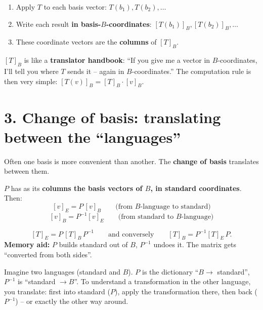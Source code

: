 \documentclass[a4paper,12pt]{article}
\begin{document}
\begin{merkbox}[title={Construction of $[T]_B$}]
\begin{enumerate}[nosep]
    \item Apply $T$ to each basis vector: $T(b_1), T(b_2), \dots$
    \item Write each result \textbf{in basis-$B$-coordinates}: $[T(b_1)]_B, [T(b_2)]_B, \dots$
    \item These coordinate vectors are the \textbf{columns} of $[T]_B$.
\end{enumerate}
\end{merkbox}

\begin{analogie}
$[T]_B$ is like a \textbf{translator handbook}: ``If you give me a vector in $B$-coordinates, I'll tell you where $T$ sends it -- again in $B$-coordinates.'' The computation rule is then very simple: $[T(v)]_B = [T]_B \cdot [v]_B$.
\end{analogie}

\section*{3. Change of basis: translating between the ``languages''}

Often one basis is more convenient than another. The \textbf{change of basis} translates between them.

\begin{merkbox}[title={The change-of-basis matrix $P$}]
$P$ has as its \textbf{columns the basis vectors of $B$, in standard coordinates}. Then:
\[
[v]_E = P \, [v]_B \qquad\text{(from $B$-language to standard)}
\]
\[
[v]_B = P^{-1} [v]_E \qquad\text{(from standard to $B$-language)}
\]
\end{merkbox}

\begin{merkbox}[title={Change of basis for transformations}]
\[
[T]_E = P\,[T]_B\,P^{-1} \qquad\text{and conversely}\qquad [T]_B = P^{-1} [T]_E\, P.
\]
\textbf{Memory aid:} $P$ builds standard out of $B$, $P^{-1}$ undoes it. The matrix gets ``converted from both sides''.
\end{merkbox}

\begin{analogie}
Imagine two languages (standard and $B$). $P$ is the dictionary ``$B \to$ standard'', $P^{-1}$ is ``standard $\to B$''. To understand a transformation in the other language, you translate: first into standard ($P$), apply the transformation there, then back ($P^{-1}$) -- or exactly the other way around.
\end{analogie}
\end{document}
